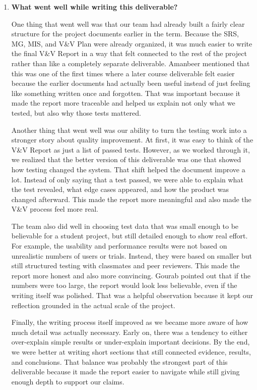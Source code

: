 \documentclass[12pt]{article}
\begin{document}
\begin{enumerate}
    \item \textbf{What went well while writing this
deliverable?}

One thing that went well was that our team had already built a fairly
clear structure for the project documents earlier in the term. Because
the SRS, MG, MIS, and V\&V Plan were already organized, it was much
easier to write the final V\&V Report in a way that felt connected to
the rest of the project rather than like a completely separate
deliverable. Amanbeer mentioned that this was one of the first times
where a later course deliverable felt easier because the earlier
documents had actually been useful instead of just feeling like
something written once and forgotten. That was important because it
made the report more traceable and helped us explain not only what we
tested, but also why those tests mattered.

Another thing that went well was our ability to turn the testing work
into a stronger story about quality improvement. At first, it was easy
to think of the V\&V Report as just a list of passed tests. However, as
we worked through it, we realized that the better version of this
deliverable was one that showed how testing changed the system. That
shift helped the document improve a lot. Instead of only saying that a
test passed, we were able to explain what the test revealed, what edge
cases appeared, and how the product was changed afterward. This made
the report more meaningful and also made the V\&V process feel more
real.

The team also did well in choosing test data that was small enough to
be believable for a student project, but still detailed enough to show
real effort. For example, the usability and performance results were
not based on unrealistic numbers of users or trials. Instead, they were
based on smaller but still structured testing with classmates and peer
reviewers. This made the report more honest and also more convincing.
Gourab pointed out that if the numbers were too large, the report would
look less believable, even if the writing itself was polished. That was
a helpful observation because it kept our reflection grounded in the
actual scale of the project.

Finally, the writing process itself improved as we became more aware of
how much detail was actually necessary. Early on, there was a tendency
to either over-explain simple results or under-explain important
decisions. By the end, we were better at writing short sections that
still connected evidence, results, and conclusions. That balance was
probably the strongest part of this deliverable because it made the
report easier to navigate while still giving enough depth to support
our claims.


\end{enumerate}
\end{document}
